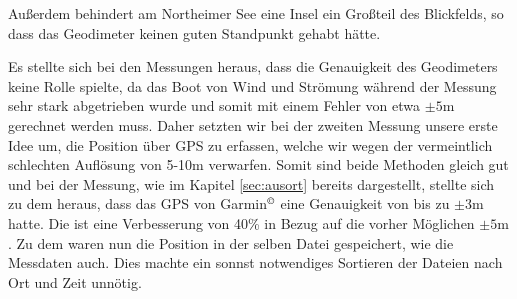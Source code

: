 \documentclass[12pt,a4paper,titlepage,headinclude,bibtotoc]{scrartcl}
\numberwithin{equation}{subsection}
\begin{document}
Außerdem behindert am Northeimer See eine Insel ein Großteil des Blickfelds, so dass das Geodimeter keinen guten Standpunkt gehabt hätte.

Es stellte sich bei den Messungen heraus, dass die Genauigkeit des Geodimeters keine Rolle spielte, da das Boot von Wind und Strömung während der Messung sehr stark abgetrieben wurde und somit mit einem Fehler von etwa $\pm5\si{\meter}$ gerechnet werden muss.
Daher setzten wir bei der zweiten Messung unsere erste Idee um, die Position über GPS zu erfassen, welche wir wegen der vermeintlich schlechten Auflösung von 5-10m verwarfen.
Somit sind beide Methoden gleich gut und bei der Messung, wie im Kapitel \ref{sec:ausort} bereits dargestellt, stellte sich zu dem heraus, dass das GPS von Garmin$^\copyright$ eine Genauigkeit von bis zu $\pm3\si{\meter}$ hatte.
Die ist eine Verbesserung von 40\% in Bezug auf die vorher Möglichen $\pm5\si{\meter}$.
Zu dem waren nun die Position in der selben Datei gespeichert, wie die Messdaten auch.
Dies machte ein sonnst notwendiges Sortieren der Dateien nach Ort und Zeit unnötig.
\end{document}
